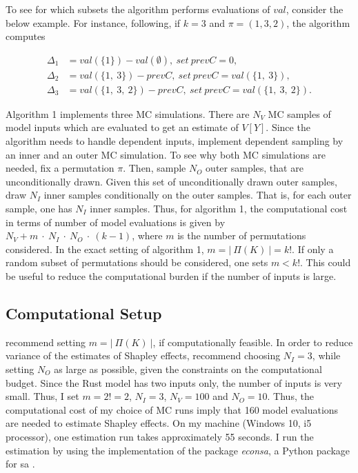 To see for which subsets the algorithm performs evaluations of $val$, consider the below example. For instance, following\citet{SNS16}, if $k=3$ and $\pi=(1, 3, 2)$, the algorithm computes

\begin{align}
\Delta_1 &=val(\{1\})-val(\emptyset),\ set\ prevC=0, \\
\Delta_2 &=val(\{1,\ 3\})-prevC,\ set\ prevC=val(\{1,\ 3\}), \\
\Delta_3 &=val(\{1,\ 3,\ 2\})-prevC,\ set\ prevC=val(\{1,\ 3,\ 2\}).
\end{align}

Algorithm 1 implements three MC simulations. There are $N_V$ MC samples of model inputs which are evaluated to get an estimate of $V[Y]$. Since the algorithm needs to handle dependent inputs, \citet{SNS16} implement dependent sampling by an inner and an outer MC simulation. To see why both MC simulations are needed, fix a permutation $\pi$. Then, sample $N_O$ outer samples, that are unconditionally drawn. Given this set of unconditionally drawn outer samples, draw $N_I$ inner samples conditionally on the outer samples. That is, for each outer sample, one has $N_I$ inner samples. Thus, for algorithm 1, the computational cost in terms of number of model evaluations is given by $N_V+m\ \cdot\ N_I\ \cdot\ N_O\ \cdot\ (k-1)$, where $m$ is the number of permutations considered. In the exact setting of algorithm 1, $m=\vert\ \Pi(K)\ \vert=k!$. If only a random subset of permutations should be considered, one sets $m<k!$. This could be useful to reduce the computational burden if the number of inputs is large.

\subsection{Computational Setup}

\citet{SNS16} recommend setting $m=\vert\ \Pi(K)\ \vert$, if computationally feasible. In order to reduce variance of the estimates of Shapley effects, \citet{SNS16} recommend choosing $N_I=3$, while setting $N_O$ as large as possible, given the constraints on the computational budget. Since the Rust model has two inputs only, the number of inputs is very small. Thus, I set $m=2!=2$, $N_I=3$, $N_V=100$ and $N_O=10$. Thus, the computational cost of my choice of MC runs imply that 160 model evaluations are needed to estimate Shapley effects. On my machine (Windows 10, i5 processor), one estimation run takes approximately 55 seconds. I run the estimation by using the implementation of the package \textit{econsa}, a Python package for sa \citep{OSE21}.

